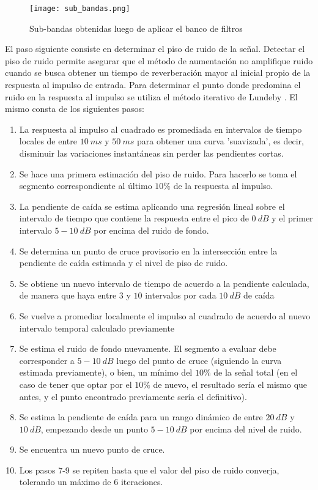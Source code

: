 \begin{figure}[H]
	\centering{}
	\texttt{[image: sub\_bandas.png]}
	\caption{Sub-bandas obtenidas luego de aplicar el banco de filtros}
	\label{fig:sub_bandas}
\end{figure}

El paso siguiente consiste en determinar el piso de ruido de la señal. Detectar el piso de ruido permite asegurar que el método de aumentación no amplifique ruido cuando se busca obtener un tiempo de reverberación mayor al inicial propio de la respuesta al impulso de entrada. Para determinar el punto donde predomina el ruido en la respuesta al impulso se utiliza el método iterativo de Lundeby \cite{Lundeby}. El mismo consta de los siguientes pasos: 

\begin{enumerate}
\item La respuesta al impulso al cuadrado es promediada en intervalos de tiempo locales de entre $10 \ ms$ y $50 \ ms$ para obtener una curva 'suavizada', es decir, disminuir las variaciones instantáneas sin perder las pendientes cortas.
\item Se hace una primera estimación del piso de ruido. Para hacerlo se toma el segmento correspondiente al último $10\%$ de la respuesta al impulso.
\item La pendiente de caída se estima aplicando una regresión lineal sobre el intervalo de tiempo que contiene la respuesta entre el pico de $0 \ dB$ y el primer intervalo $5-10 \ dB$ por encima del ruido de fondo.
\item Se determina un punto de cruce provisorio en la intersección entre la pendiente de caída estimada y el nivel de piso de ruido.
\item Se obtiene un nuevo intervalo de tiempo de acuerdo a la pendiente calculada, de manera que haya entre $3$ y $10$ intervalos por cada $10 \ dB$ de caída
\item Se vuelve a promediar localmente el impulso al cuadrado de acuerdo al nuevo intervalo temporal calculado previamente 
\item Se estima el ruido de fondo nuevamente. El segmento a evaluar debe corresponder a $5-10 \ dB$ luego del punto de cruce (siguiendo la curva estimada previamente), o bien, un mínimo del $10\%$ de la señal total (en el caso de tener que optar por el $10\%$ de nuevo, el resultado sería el mismo que antes, y el punto encontrado previamente sería el definitivo).
\item Se estima la pendiente de caída para un rango dinámico de entre $20 \ dB$ y $10 \ dB$, empezando desde un punto $5-10 \ dB$ por encima del nivel de ruido.
\item Se encuentra un nuevo punto de cruce.
\item Los pasos 7-9 se repiten hasta que el valor del piso de ruido converja, tolerando un máximo de 6 iteraciones.
\end{enumerate}

